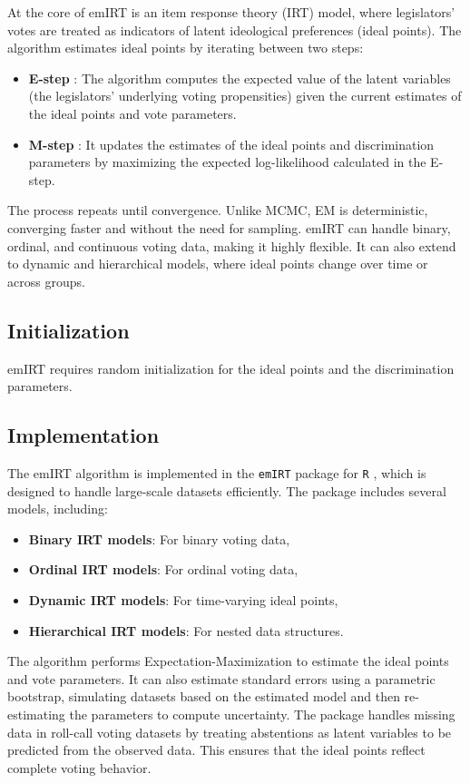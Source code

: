 \documentclass{report}
\begin{document}
    At the core of emIRT is an item response theory (IRT) model, where legislators' votes are treated as
    indicators of latent ideological preferences (ideal points). The algorithm estimates ideal points by
    iterating between two steps:
    \begin{itemize}
        \item \textbf{E-step}
        : The algorithm computes the expected value of the latent variables (the legislators' underlying
        voting propensities) given the current estimates of the ideal points and vote parameters.
        \item \textbf{M-step}
        : It updates the estimates of the ideal points and discrimination parameters by maximizing the
        expected log-likelihood calculated in the E-step.
    \end{itemize}
    The process repeats until convergence. Unlike MCMC, EM is deterministic, converging faster and without
    the need for sampling. emIRT can handle binary, ordinal, and continuous voting data, making it highly
    flexible. It can also extend to dynamic and hierarchical models, where ideal points change over
    time or across groups.

    \subsection{Initialization}
    emIRT requires random initialization for the ideal points and the discrimination
    parameters.

    \subsection{Implementation}
    The emIRT algorithm is implemented in the \texttt{emIRT} package for \texttt{R}
    , which is designed to handle large-scale datasets efficiently. The package includes several
    models, including:
    \begin{itemize}
        \item \textbf{Binary IRT models}: For binary voting data,
        \item \textbf{Ordinal IRT models}: For ordinal voting data,
        \item \textbf{Dynamic IRT models}: For time-varying ideal points,
        \item \textbf{Hierarchical IRT models}: For nested data structures.
    \end{itemize}

    The algorithm performs Expectation-Maximization to estimate the ideal points and vote parameters. It can
    also estimate standard errors using a parametric bootstrap, simulating datasets based on the estimated
    model and then re-estimating the parameters to compute uncertainty. The package handles missing data in
    roll-call voting datasets by treating abstentions as latent variables to be predicted from the observed
    data. This ensures that the ideal points reflect complete voting behavior.
\end{document}
